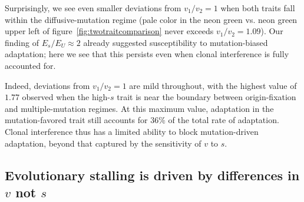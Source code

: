 \documentclass[9pt,twocolumn,twoside]{article}
\begin{document}
Surprisingly, we see even smaller deviations from $v_1/v_2=1$ when both traits fall within the diffusive-mutation regime (pale color in the neon green vs. neon green upper left of figure~\ref{fig:twotraitcomparison} never exceeds $v_1/v_2=1.09$). Our finding of $E_s/E_U\approx 2$ already suggested susceptibility to mutation-biased adaptation; here we see that this persists even when clonal interference is fully accounted for.

Indeed, deviations from $v_1/v_2=1$ are mild throughout, with the highest value of $1.77$ observed when the high-$s$ trait is near the boundary between origin-fixation and multiple-mutation regimes. At this maximum value, adaptation in the mutation-favored trait still accounts for $36\%$ of the total rate of adaptation. Clonal interference thus has a limited ability to block mutation-driven adaptation, beyond that captured by the sensitivity of $v$ to $s$.

\subsection{Evolutionary stalling is driven by differences in $v$ not $s$}
\label{subsec:results:evolstall}
\end{document}
